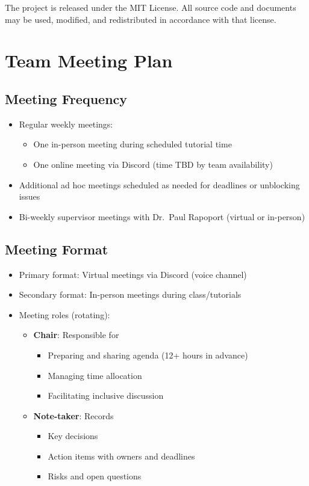 \documentclass{article}
\begin{document}
The project is released under the MIT License. All source code and documents may be used, modified, and redistributed in accordance with that license.

\section{Team Meeting Plan}

\subsection*{Meeting Frequency}
\begin{itemize}
  \item Regular weekly meetings:
  \begin{itemize}
    \item One in-person meeting during scheduled tutorial time
    \item One online meeting via Discord (time TBD by team availability)
  \end{itemize}
  \item Additional ad hoc meetings scheduled as needed for deadlines or unblocking issues
  \item Bi-weekly supervisor meetings with Dr.~Paul Rapoport (virtual or in-person)
\end{itemize}

\subsection*{Meeting Format}
\begin{itemize}
  \item Primary format: Virtual meetings via Discord (voice channel)
  \item Secondary format: In-person meetings during class/tutorials
  \item Meeting roles (rotating):
  \begin{itemize}
    \item \textbf{Chair}: Responsible for
    \begin{itemize}
      \item Preparing and sharing agenda (12+ hours in advance)
      \item Managing time allocation
      \item Facilitating inclusive discussion
    \end{itemize}
  \item \textbf{Note-taker}: Records
    \begin{itemize}
      \item Key decisions
      \item Action items with owners and deadlines
      \item Risks and open questions
    \end{itemize}
  \end{itemize}
\end{itemize}
\end{document}
